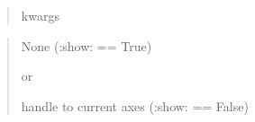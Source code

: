 \documentclass[letterpaper,10pt,english]{sphinxmanual}
\begin{document}
\begin{fulllineitems}
\begin{description}
\begin{quote}
\begin{description}
\item[{kwargs}] \leavevmode
{}

\end{description}\end{quote}

\item[{Returns:}] \leavevmode\begin{quote}\begin{description}
\item[{returns}] \leavevmode
\begin{DUlineblock}{0em}
\item[] None (:show: == True) 
\item[]
\begin{DUlineblock}{\DUlineblockindent}
\item[] or 
\end{DUlineblock}
\item[] handle to current axes (:show: == False)
\end{DUlineblock}

\end{description}\end{quote}

\end{description}

\end{fulllineitems}

\end{document}
